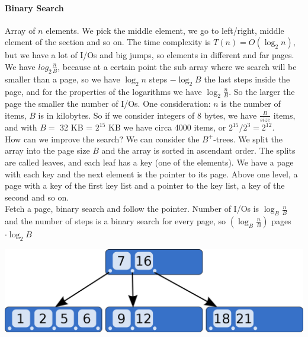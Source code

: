 \documentclass[10pt]{report}
\begin{document}
\paragraph{Binary Search} Array of $n$ elements. We pick the middle element, we go to left/right, middle element of the section and so on. The time complexity is $T(n) = O(\log_2 n)$, but we have a lot of I/Os and big jumps, so elements in different and far pages. We have $log_2 \frac{n}{B}$, because at a certain point the sub array where we search will be smaller than a page, so we have $\log_2 n$ steps $- \log_2 B$ the last steps inside the page, and for the properties of the logarithms we have $\log_2 \frac{n}{B}$. So the larger the page the smaller the number of I/Os. One consideration: $n$ is the number of items, $B$ is in kilobytes. So if we consider integers of 8 bytes, we have $\frac{B}{size}$ items, and with $B =$ 32 KB = $2^{15}$ KB we have circa 4000 items, or $2^{15}/2^3 = 2^{12}$.\\
How can we improve the search? We can consider the $B^+$-trees. We split the array into the page size $B$ and the array is sorted in ascendant order. The splits are called leaves, and each leaf has a key (one of the elements). We have a page with each key and the next element is the pointer to its page. Above one level, a page with a key of the first key list and a pointer to the key list, a key of the second and so on.\\ %
Fetch a page, binary search and follow the pointer. Number of I/Os is $\log_B \frac{n}{B}$ and the number of steps is a binary search for every page, so $(\log_B \frac{n}{B})$ pages $\cdot \log_2 B$
\begin{center}
	\includegraphics[scale=0.25]{2.png}
\end{center}
\end{document}
